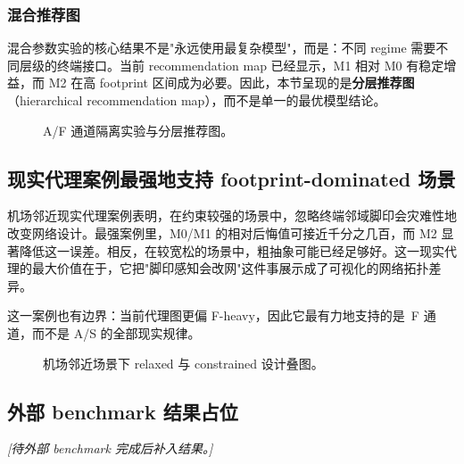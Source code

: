 \documentclass[review,authoryear]{elsarticle}
\begin{document}
\subsubsection{混合推荐图}
\label{sec:results:mixed}

混合参数实验的核心结果不是"永远使用最复杂模型"，而是：不同 regime 需要不同层级的终端接口。当前 recommendation map 已经显示，M1 相对 M0 有稳定增益，而 M2 在高 footprint 区间成为必要。因此，本节呈现的是\textbf{分层推荐图}（hierarchical recommendation map），而不是单一的最优模型结论。

\begin{figure}[htbp]
  \centering
  \caption{A/F 通道隔离实验与分层推荐图。}
  \label{fig:regime}
\end{figure}

\subsection{现实代理案例最强地支持 footprint-dominated 场景}
\label{sec:results:proxy}

机场邻近现实代理案例表明，在约束较强的场景中，忽略终端邻域脚印会灾难性地改变网络设计。最强案例里，M0/M1 的相对后悔值可接近千分之几百，而 M2 显著降低这一误差。相反，在较宽松的场景中，粗抽象可能已经足够好。这一现实代理的最大价值在于，它把"脚印感知会改网"这件事展示成了可视化的网络拓扑差异。

这一案例也有边界：当前代理图更偏 F-heavy，因此它最有力地支持的是~F 通道，而不是 A/S 的全部现实规律。

\begin{figure}[htbp]
  \centering
  \caption{机场邻近场景下 relaxed 与 constrained 设计叠图。}
  \label{fig:proxy}
\end{figure}

\subsection{外部 benchmark 结果占位}
\label{sec:results:benchmark}

\textit{[待外部 benchmark 完成后补入结果。]}
\end{document}
